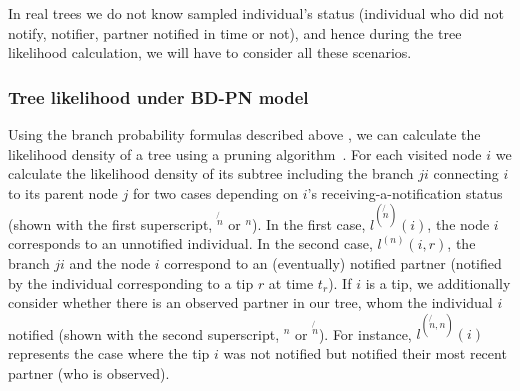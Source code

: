 \documentclass[10pt,letterpaper]{article}
\begin{document}

\smallskip

In real trees we do not know sampled individual's status (individual who did not notify, notifier, partner notified in time or not), and hence during the tree likelihood calculation, we will have to consider all these scenarios.

 

\subsubsection*{Tree likelihood under BD-PN model} 

Using the branch probability formulas described above%
, we can calculate the likelihood density of a tree using a pruning algorithm~\cite{10.1093/sysbio/22.3.240}. For each visited node $i$ we calculate the likelihood density of its subtree including the branch $ji$ connecting $i$ to its parent node $j$ for two cases depending on $i$'s receiving-a-notification status (shown with the first superscript, $^{\not{n}}$ or $^n$). In the first case,  $l^{(\not{n})}(i)$, the node $i$ corresponds to an unnotified individual. In the second case, $l^{(n)}(i, r)$, the branch $ji$ and the node $i$ correspond to an (eventually) notified partner (notified by the individual corresponding to a tip $r$ at time $t_r$). If $i$ is a tip, we additionally consider whether there is an observed partner in our tree, whom the individual $i$ notified  (shown with the second superscript, $^n$ or $^{\not{n}}$). For instance, $l^{(\not{n},n)}(i)$ represents the case where the tip $i$ was not notified but notified their most recent partner (who is observed). %
\end{document}
